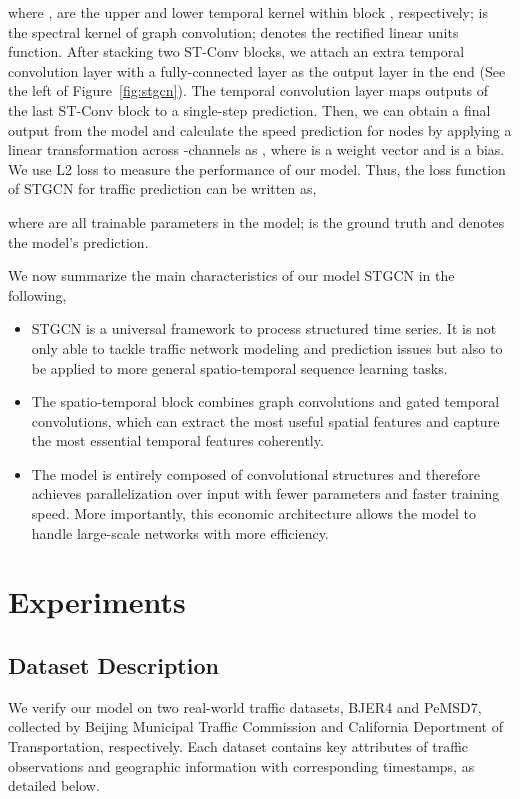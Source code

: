 \documentclass{article}
\begin{document}
where ,  are the upper and lower temporal kernel within block , respectively;  is the spectral kernel of graph convolution;  denotes the rectified linear units function. After stacking two ST-Conv blocks, we attach an extra temporal convolution layer with a fully-connected layer as the output layer in the end (See the left of Figure~\ref{fig:stgcn}). The temporal convolution layer maps outputs of the last ST-Conv block to a single-step prediction. Then, we can obtain a final output  from the model and calculate the speed prediction for  nodes by applying a linear transformation across -channels as , where  is a weight vector and  is a bias. We use L2 loss to measure the performance of our model. Thus, the loss function of STGCN for traffic prediction can be written as,

where  are all trainable parameters in the model;  is the ground truth and  denotes the model's prediction.

We now summarize the main characteristics of our model STGCN in the following, 
\begin{itemize}
	\item STGCN is a universal framework to process structured time series. It is not only able to tackle traffic network modeling and prediction issues but also to be applied to more general spatio-temporal sequence learning tasks. 
	\item The spatio-temporal block combines graph convolutions and gated temporal convolutions, which can extract the most useful spatial features and capture the most essential temporal features coherently. 
	\item The model is entirely composed of convolutional structures and therefore achieves parallelization over input with fewer parameters and faster training speed. More importantly, this economic architecture allows the model to handle large-scale networks with more efficiency.
\end{itemize}

\section{Experiments}
\subsection{Dataset Description}
We verify our model on two real-world traffic datasets, BJER4 and PeMSD7, collected by Beijing Municipal Traffic Commission and California Deportment of Transportation, respectively. Each dataset contains key attributes of traffic observations and geographic information with corresponding timestamps, as detailed below. 
\end{document}
